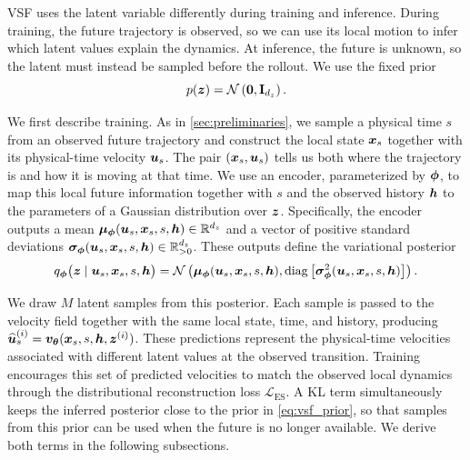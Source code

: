VSF uses the latent variable differently during training and inference. During
training, the future trajectory is observed, so we can use its local motion to
infer which latent values explain the dynamics. At inference, the
future is unknown, so the latent must instead be sampled before the rollout.
We use the fixed prior
\begin{equation}
p({\bm{z}})
=
\mathcal N
\left(
\mathbf{0},
\mathbf{I}_{d_z}
\right).
\label{eq:vsf_prior}
\end{equation}

We first describe training. As in \cref{sec:preliminaries}, we sample a
physical time $s$ from an observed future trajectory and construct the local
state ${\bm{x}}_s$ together with its physical-time velocity ${\bm{u}}_s$. The pair
$({\bm{x}}_s,{\bm{u}}_s)$ tells us both where the trajectory is and how it is moving at
that time. We use an encoder, parameterized by $\boldsymbol{\phi}$, to map this local
future information together with $s$ and the observed history ${\bm{h}}$ to the
parameters of a Gaussian distribution over ${\bm{z}}$. Specifically, the encoder
outputs a mean
$\boldsymbol{\mu}_{\boldsymbol{\phi}}({\bm{u}}_s,{\bm{x}}_s,s,{\bm{h}})\in\mathbb R^{d_z}$
and a vector of positive standard deviations
$\boldsymbol{\sigma}_{\boldsymbol{\phi}}({\bm{u}}_s,{\bm{x}}_s,s,{\bm{h}})\in\mathbb R_{>0}^{d_z}$.
These outputs define the variational posterior
\begin{equation}
q_{\boldsymbol{\phi}}
\bigl(
{\bm{z}}
\mid
{\bm{u}}_s,{\bm{x}}_s,s,{\bm{h}}
\bigr)
=
\mathcal N
\left(
\boldsymbol{\mu}_{\boldsymbol{\phi}}({\bm{u}}_s,{\bm{x}}_s,s,{\bm{h}}),
\operatorname{diag}
\left[
\boldsymbol{\sigma}_{\boldsymbol{\phi}}^2({\bm{u}}_s,{\bm{x}}_s,s,{\bm{h}})
\right]
\right).
\label{eq:vsf_variational_posterior}
\end{equation}

We draw $M$ latent samples from this posterior. Each sample is passed to the
velocity field together with the same local state, time, and history,
producing
$\widehat{{\bm{u}}}_s^{(i)}
=
{\bm{v}}_{{\bm{\theta}}}({\bm{x}}_s,s,{\bm{h}},{\bm{z}}^{(i)})$.
These predictions represent the physical-time velocities associated with
different latent values at the observed transition. Training encourages this
set of predicted velocities to match the observed local dynamics through the
distributional reconstruction loss $\mathcal L_{\mathrm{ES}}$. A KL term
simultaneously keeps the inferred posterior close to the prior in
\cref{eq:vsf_prior}, so that samples from this prior can be used when the
future is no longer available. We derive both terms in the following
subsections.

